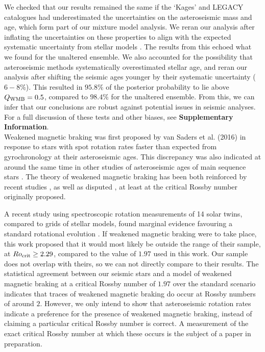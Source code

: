 \documentclass[12pt]{article}
\newcommand{\rtwo}[1]{{#1}}
\begin{document}
We checked that our results remained the same if the `Kages' and LEGACY catalogues had underestimated the uncertainties on the asteroseismic mass and age, which form part of our mixture model analysis. We reran our analysis after inflating the uncertainties on these properties to align with the expected systematic uncertainty from stellar models \cite{silvaaguirre+2015,silvaaguirre+2017}. The results from this echoed what we found for the unaltered ensemble. We also accounted for the possibility that asteroseismic methods systematically overestimated stellar age, and reran our analysis after shifting the seismic ages younger by their systematic uncertainty ($6-8\%$). This resulted in $95.8\%$ of the posterior probability to lie above $Q_{\rm WMB} = 0.5$, compared to $98.4\%$ for the unaltered ensemble. From this, we can infer that our conclusions are robust against potential issues in seismic analyses. For a full discussion of these tests and other biases, see \textbf{Supplementary Information}.\\

Weakened magnetic braking was first proposed by van Saders et al. (2016) \cite[hereafter the `van Saders' study]{vansaders+2016} in response to stars with spot rotation rates faster than expected from gyrochronology at their asteroseismic ages. This discrepancy was also indicated at around the same time in other studies of asteroseismic ages of main sequence stars \cite{angus+2015, nielsen+2015,  davies+2015}. The theory of weakened magnetic braking has been both reinforced by recent studies \cite{metcalfe+egeland2019}, as well as disputed \cite{lorenzo-oliveira+2019}, at least at the critical Rossby number originally proposed.

A recent study using spectroscopic rotation measurements of 14 solar twins, compared to grids of stellar models, found marginal evidence favouring a standard rotational evolution \cite{lorenzo-oliveira+2019}. If weakened magnetic braking were to take place, this work proposed that it would most likely be outside the range of their sample, at $Ro_{\rm {crit}} \geq 2.29$, compared to the value of $1.97$ used in this work. Our sample does not overlap with theirs, so we can not directly compare to their results.
The statistical agreement between our seismic stars and a model of weakened magnetic braking at a critical Rossby number of $1.97$ over the standard scenario indicates that traces of weakened magnetic braking do occur at Rossby numbers of around $2$. \rtwo{However, we only intend to show that asteroseismic rotation rates indicate a preference for the presence of weakened magnetic braking, instead of claiming a particular critical Rossby number is correct. A measurement of the exact critical Rossby number at which these occurs is the subject of a paper in preparation.}
\end{document}
